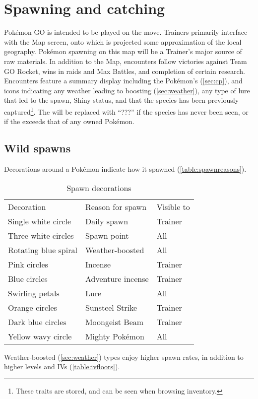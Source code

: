 \chapter{Spawning and catching\label{chap:spawn}}
Pokémon GO is intended to be played on the move.
Trainers primarily interface with the Map screen, onto which is projected
  some approximation of the local geography.
Pokémon spawning on this map will be a Trainer's major source of raw materials.
In addition to the Map, encounters follow victories against Team GO Rocket,
  wins in raids and Max Battles, and completion of certain research.
Encounters feature a summary display including the Pokémon's \CP{} (\autoref{sec:cp}),
  and icons indicating any weather leading to boosting (\autoref{sec:weather}),
  any type of lure that led to the spawn,
  Shiny status,
  and that the species has been previously captured\footnote{These traits are stored, and can be seen when browsing inventory.}.
The \CP{} will be replaced with ``???'' if the species has never been seen, or if
  the \CP{} exceeds that of any owned Pokémon.

\section{Wild spawns\label{sec:spawns}}
Decorations around a Pokémon indicate how it spawned (\autoref{table:spawnreasons}).
\begin{table}
\centering
\begin{tabular}{lll}
  Decoration & Reason for spawn & Visible to\\
\Midrule
  Single white circle & Daily spawn & Trainer\\
  Three white circles & Spawn point & All\\
  Rotating blue spiral & Weather-boosted & All\\
  Pink circles & Incense & Trainer\\
  Blue circles & Adventure incense & Trainer\\
  Swirling petals & Lure & All\\
  Orange circles & Sunsteel Strike & Trainer\\
  Dark blue circles & Moongeist Beam & Trainer\\
  Yellow wavy circle & Mighty Pokémon & All
\end{tabular}
  \caption{Spawn decorations\label{table:spawnreasons}}
\end{table}
Weather-boosted (\autoref{sec:weather}) types enjoy higher spawn rates,
  in addition to higher levels and IVs (\autoref{table:ivfloors}).

